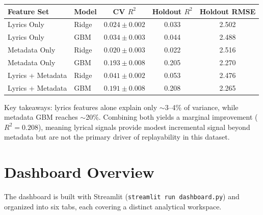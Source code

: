 \documentclass[11pt, letterpaper]{article}
\begin{document}
\begin{center}
\begin{tabular}{llccc}
\toprule
Feature Set & Model & CV $R^2$ & Holdout $R^2$ & Holdout RMSE \\
\midrule
Lyrics Only        & Ridge & $0.024 \pm 0.002$ & 0.033 & 2.502 \\
Lyrics Only        & GBM   & $0.034 \pm 0.003$ & 0.044 & 2.488 \\
Metadata Only      & Ridge & $0.020 \pm 0.003$ & 0.022 & 2.516 \\
Metadata Only      & GBM   & $0.193 \pm 0.008$ & 0.205 & 2.270 \\
Lyrics + Metadata  & Ridge & $0.041 \pm 0.002$ & 0.053 & 2.476 \\
Lyrics + Metadata  & GBM   & $0.191 \pm 0.008$ & 0.208 & 2.265 \\
\bottomrule
\end{tabular}
\end{center}

Key takeaways: lyrics features alone explain only $\sim$3–4\% of variance, while metadata GBM reaches $\sim$20\%. Combining both yields a marginal improvement ($R^2 = 0.208$), meaning lyrical signals provide modest incremental signal beyond metadata but are not the primary driver of replayability in this dataset.

\section{Dashboard Overview}

The dashboard is built with Streamlit (\texttt{streamlit run dashboard.py})
and organized into six tabs, each covering a distinct analytical workspace.
\end{document}

